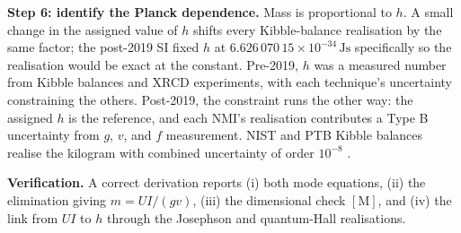 \begin{exercise}
\textbf{Step 6: identify the Planck dependence.} Mass is
proportional to $h$. A small change in the assigned value of $h$
shifts every Kibble-balance realisation by the same factor; the
post-2019 SI fixed $h$ at $6.626\,070\,15 \times 10^{-34} \,\si
{\joule\second}$ specifically so the realisation would be exact at
the constant. Pre-2019, $h$ was a measured number from Kibble
balances and XRCD experiments, with each technique's uncertainty
constraining the others. Post-2019, the constraint runs the other
way: the assigned $h$ is the reference, and each NMI's realisation
contributes a Type B uncertainty from $g$, $v$, and $f$
measurement. NIST and PTB Kibble balances realise the kilogram
with combined uncertainty of order $10^{-8}$ \cite{web:bipm-kilogram-history}.

\textbf{Verification.} A correct derivation reports (i) both
mode equations, (ii) the elimination giving $m = UI/(gv)$, (iii)
the dimensional check $[\text{M}]$, and (iv) the link from $UI$ to
$h$ through the Josephson and quantum-Hall realisations.
\end{exercise}

